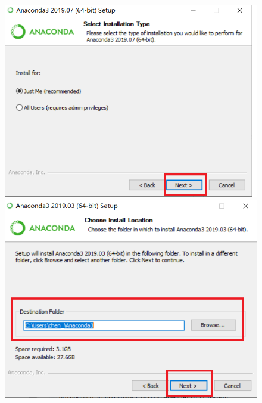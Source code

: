 \begin{figure}[!ht]
  \centering
  \includegraphics[scale=0.5]{figure/chapter1/anaconda9.png}\quad
  \includegraphics[scale=0.5]{figure/chapter1/anaconda3.png}
\end{figure}

